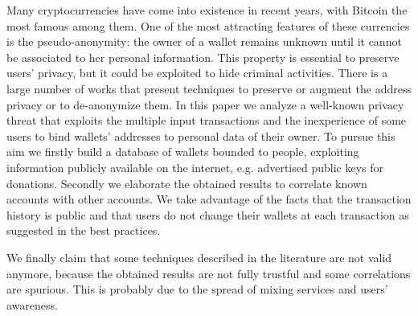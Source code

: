 Many cryptocurrencies have come into existence in recent years, with Bitcoin
the most famous among them. One of the most attracting features of these
currencies is the pseudo-anonymity: the owner of a wallet remains unknown until
it cannot be associated to her personal information.
This property is essential to preserve users' privacy, but it could be
exploited to hide criminal activities. There is a large number of works that
present techniques to preserve or augment the address privacy or to
de-anonymize them.
In this paper we analyze a well-known privacy threat that exploits the multiple
input transactions and the inexperience of some users to bind wallets’
addresses to personal data of their owner.
To pursue this aim we firstly build a database of wallets bounded
to people, exploiting information publicly available on the internet, e.g.
advertised public keys for donations.
Secondly we elaborate the obtained results to correlate known accounts with
other accounts. We take advantage of
the facts that the transaction history is public and that users do not change
their wallets at each transaction as suggested in the best practices.

We finally claim that some techniques described in the literature are not
valid anymore, because the obtained results are not fully trustful and some
correlations are spurious. This is probably due to the spread of mixing
services and users' awareness.
